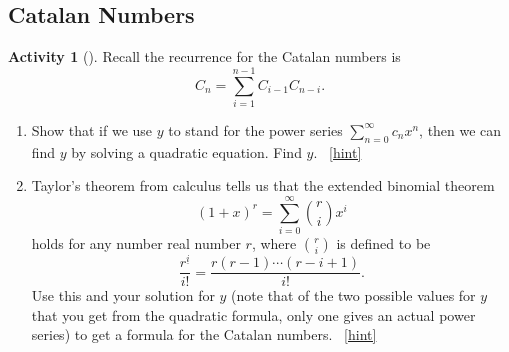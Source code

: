 \documentclass[10pt,]{book}
\theoremstyle{plain}
\theoremstyle{definition}
\theoremstyle{definition}
\theoremstyle{definition}
\newtheorem{activity}[project]{Activity}
\numberwithin{equation}{chapter}
\begin{document}
\subsection[{Catalan Numbers}]{Catalan Numbers}\label{subsection-39}
\begin{activity}[]\label{CatalanRecurrence}
\hypertarget{p-1387}{}%
Recall the recurrence for the Catalan numbers is%
\begin{equation*}
C_n = \sum_{i=1}^{n-1} C_{i-1}C_{n-i}\text{.}
\end{equation*}
%
\begin{enumerate}[font=\bfseries,label=(\alph*),ref=\alph*]
\item\label{task-254} \hypertarget{p-1388}{}%
Show that if we use \(y\) to stand for the power series \(\sum_{n=0}^\infty c_nx^n\), then we can find \(y\) by solving a quadratic equation. Find \(y\).%
~\hfill{\tiny\hyperlink{a-271.a}{[hint]}\hypertarget{q-271.a}{}}\item\label{task-255} \hypertarget{p-1391}{}%
Taylor's theorem from calculus tells us that the extended binomial theorem%
\begin{equation*}
(1+x)^r = \sum_{i=0}^\infty \binom{r}{i}x^i
\end{equation*}
holds for any number real number \(r\), where \(\binom{r}{i}\) is defined to be%
\begin{equation*}
\frac{r^{\underline{i}}}{i!} = \frac{r(r-1)\cdots(r-i+1)}{i!}\text{.}
\end{equation*}
Use this and your solution for \(y\) (note that of the two possible values for \(y\) that you get from the quadratic formula, only one gives an actual power series) to get a formula for the Catalan numbers.%
~\hfill{\tiny\hyperlink{a-271.b}{[hint]}\hypertarget{q-271.b}{}}\end{enumerate}
\end{activity}
\typeout{************************************************}
\typeout{************************************************}
\end{document}

